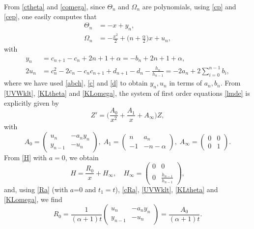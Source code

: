 \documentclass[10pt, reqno]{amsart}
\numberwithin{equation}{section}
\numberwithin{equation}{section}
\begin{document}
From \eqref{ctheta} and \eqref{comega}, since $\Theta_n$ and $\Omega_n$ are polynomials, using \eqref{cp} and \eqref{cep}, one easily computes that 
\begin{align}
\Theta_n&=-x+y_n,\label{KLtheta}\\
\Omega_n&=-\frac{x^2}{2}+\big(n+\frac{\alpha}{2}\big)x+u_n,\label{KLomega}
\end{align}
with
\begin{align}
y_n&=c_{n+1}-c_n+2n+1+\alpha=-b_n+2n+1+\alpha,\label{KLy}\\
2u_n&=c_n^2-2c_n-c_nc_{n+1}+d_{n+1}-d_n-\frac{h_n}{h_{n-1}}=-2a_n+2\sum_{i=0}^{n-1}b_i,\label{KLu}
\end{align}
where we have used \eqref{abch}, \eqref{c} and \eqref{d} to obtain $y_n, u_n$ in terms of $a_n, b_n$. From \eqref{UVWklt}, \eqref{KLtheta} and \eqref{KLomega}, the system of first order equations \eqref{lmde} is explicitly given by
\begin{equation*}
Z'=\Big(\frac{A_0}{x^2}+\frac{A_1}{x}+A_\infty\Big)Z,
\end{equation*}
with
\begin{equation}
A_0=\begin{pmatrix} u_n&-a_ny_n\\y_{n-1}&-u_n\end{pmatrix},\;
A_1=\begin{pmatrix} n& a_n\\-1& -n-\alpha\end{pmatrix},\;
A_\infty=\begin{pmatrix}0&0\\0&1\end{pmatrix}.\label{KLA}
\end{equation}
From \eqref{H} with $a=0$, we obtain
\begin{equation}
H=\frac{R_0}{x}+H_\infty,\quad H_\infty=\begin{pmatrix} 0&0\\0&\frac{\dot{h}_{n-1}}{h_{n-1}}\end{pmatrix},\label{KLH}
\end{equation}
and, using \eqref{Ra} (with $a$=0 and $t_1=t$), \eqref{cRa}, \eqref{UVWklt}, \eqref{KLtheta} and \eqref{KLomega}, we find 
\begin{equation}
R_0=\frac{1}{(\alpha+1)t}\begin{pmatrix}u_n&-a_ny_n\\
y_{n-1}&-u_n\end{pmatrix}=\frac{A_0}{(\alpha+1)t}.\label{KLH0}
\end{equation}
\end{document}

